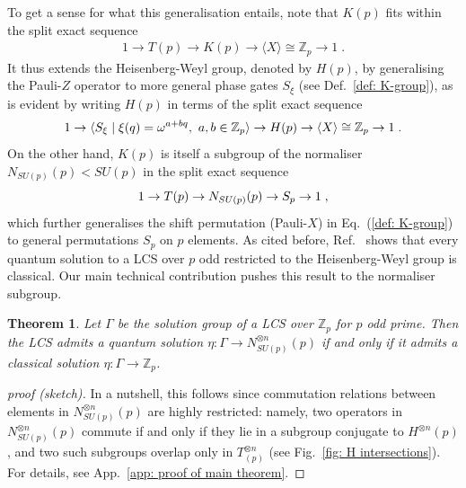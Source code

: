 \documentclass[aps,pra,letterpaper,onrcolumn,nofootinbib,notitlepage,longbibliography]{revtex4-1}
\newtheorem{theorem}{Theorem}
\newcommand{\mf}[1]{#1}
\newcommand{\ra}{\ensuremath{\rightarrow}}
\newcommand{\zz}{\mathbb Z}
\newcommand{\Z}{\mathbb Z}
\newcommand{\suchthat}{\;\ifnum\currentgrouptype=16 \middle\fi|\;}
\begin{document}
To get a sense for what this generalisation entails, note that $K(p)$ fits within the split exact sequence
\begin{align*}
    1 \ra T(p) \ra K(p) \ra \langle X\rangle\cong\zz_p \ra 1\; .
\end{align*}
It thus extends the Heisenberg-Weyl group, denoted by $H(p)$, by generalising the Pauli-$Z$ operator to more general phase gates $S_\xi$ (see Def.~\ref{def: K-group}), as is evident by writing $H(p)$ in terms of the split exact sequence
\begin{align}\label{ses: H}
    1\to \langle S_\xi\suchthat \mf{\xi(q)=\omega^{a+bq}},\  a,b\in\Z_p\rangle\to H(p)\to \langle X\rangle\cong\zz_p\to 1\; .
\end{align}
On the other hand, $K(p)$ is itself a subgroup of the normaliser $N_{SU(p)}(p)<SU(p)$ in the split exact sequence
\begin{equation}{\label{ses: N}}
    1 \ra T(p) \ra N_{SU(p)}(p) \ra S_p \ra 1\; ,
\end{equation}
which further generalises the shift permutation (Pauli-$X$) in Eq.~(\ref{def: K-group}) to general permutations $S_p$ on $p$ elements. As cited before, Ref.~\cite{QassimWallman2020} shows that every quantum solution to a LCS over $p$ odd restricted to the Heisenberg-Weyl group is classical. Our main technical contribution pushes this result to the normaliser subgroup.

\begin{theorem}\label{thm: FCO-2}
    Let $\Gamma$ be the solution group of a LCS over $\zz_p$ for $p$ odd prime. Then the LCS admits a quantum solution $\eta: \Gamma \ra N^{\otimes n}_{SU(p)}(p)$ if and only if it admits a classical solution $\eta:\Gamma\ra\zz_p$.
\end{theorem}

\begin{proof}[proof (sketch)]
    In a nutshell, this follows since commutation relations between elements in $N^{\otimes n}_{SU(p)}(p)$ are highly restricted: namely, two operators in $N^{\otimes n}_{SU(p)}(p)$ commute if and only if they lie in a subgroup conjugate to $H^{\otimes n}(p)$, and two such subgroups overlap only in $T^{\otimes n}_{(p)}$ (see Fig.~\ref{fig: H intersections}). For details, see App.~\ref{app: proof of main theorem}.
\end{proof}
\end{document}
